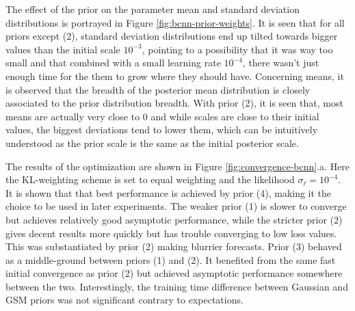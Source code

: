 The effect of the prior on the parameter mean and standard deviation distributions is portrayed in Figure \ref{fig:bcnn-prior-weights}. It is seen that for all priors except (2), standard deviation distributions end up tilted towards bigger values than the initial scale $10^{-3}$, pointing to a possibility that it was way too small and that combined with a small learning rate $10^{-4}$, there wasn't just enough time for the them to grow where they should have. Concerning means, it is observed that the breadth of the posterior mean distribution is closely associated to the prior distribution breadth. With prior (2), it is seen that, most means are actually very close to 0 and while scales are close to their initial values, the biggest deviations tend to lower them, which can be intuitively understood as the prior scale is the same as the initial posterior scale.  

The results of the optimization are shown in Figure \ref{fig:convergence-bcnn}.a. Here the KL-weighting scheme is set to equal weighting and the likelihood $\sigma_\ell = 10^{-4}$. It is shown that that best performance is achieved by prior (4), making it the choice to be used in later experiments. The weaker prior (1) is slower to converge but achieves relatively good asymptotic performance, while the stricter prior (2) gives decent results more quickly but has trouble converging to low loss values. This was substantiated by prior (2) making blurrier forecasts. Prior (3) behaved as a middle-ground between priors (1) and (2). It benefited from the same fast initial convergence as prior (2) but achieved asymptotic performance somewhere between the two. Interestingly, the training time difference between Gaussian and GSM priors was not significant contrary to expectations.

